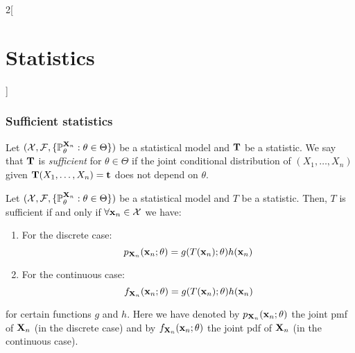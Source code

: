 \documentclass[../../../main.tex]{subfiles}
\begin{document}
\begin{multicols}{2}[\section{Statistics}]
  \subsubsection{Sufficient statistics}
  \begin{definition}
    Let $(\mathcal{X},\mathcal{F},\{\mathbb{P}_\theta^{\boldsymbol{\mathrm{X}}_n}:\theta\in\Theta\})$ be a statistical model and $\boldsymbol{\mathrm{T}}$ be a statistic. We say that $\boldsymbol{\mathrm{T}}$ is \emph{sufficient} for $\theta\in\Theta$ if the joint conditional distribution of $(X_1,\ldots,X_n)$ given $\boldsymbol{\mathrm{T}}(X_1,\ldots,X_n)=\boldsymbol{\mathrm{t}}$ does not depend on $\theta$.
  \end{definition}
  \begin{theorem}
    Let $(\mathcal{X},\mathcal{F},\{\mathbb{P}_\theta^{\boldsymbol{\mathrm{X}}_n}:\theta\in\Theta\})$ be a statistical model and $T$ be a statistic. Then, $T$ is sufficient if and only if $\forall \boldsymbol{\mathrm{x}}_n\in\mathcal{X}$ we have:
    \begin{enumerate}
      \item For the discrete case: $$p_{\boldsymbol{\mathrm{X}}_n}(\boldsymbol{\mathrm{x}}_n;\theta)=g(T(\boldsymbol{\mathrm{x}}_n);\theta)h(\boldsymbol{\mathrm{x}}_n)$$
      \item For the continuous case:  $$f_{\boldsymbol{\mathrm{X}}_n}(\boldsymbol{\mathrm{x}}_n;\theta)=g(T(\boldsymbol{\mathrm{x}}_n);\theta)h(\boldsymbol{\mathrm{x}}_n)$$
    \end{enumerate}
    for certain functions $g$ and $h$. Here we have denoted by $p_{\boldsymbol{\mathrm{X}}_n}(\boldsymbol{\mathrm{x}}_n;\theta)$ the joint pmf of $\boldsymbol{\mathrm{X}}_n$ (in the discrete case) and by $f_{\boldsymbol{\mathrm{X}}_n}(\boldsymbol{\mathrm{x}}_n;\theta)$ the joint pdf of $\boldsymbol{\mathrm{X}}_n$ (in the continuous case).
  \end{theorem}

\end{multicols}
\end{document}
